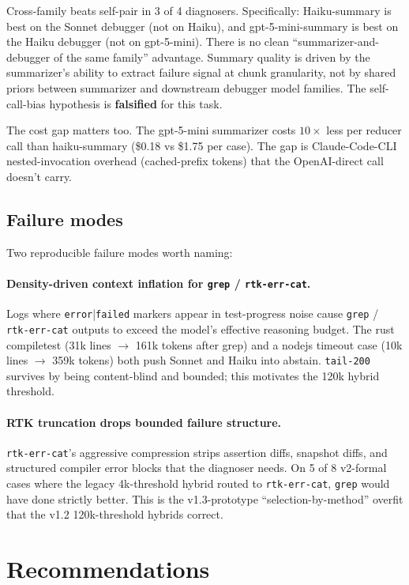 \documentclass{article}
\begin{document}
Cross-family beats self-pair in 3 of 4 diagnosers. Specifically:
Haiku-summary is best on the Sonnet debugger (not on Haiku), and
gpt-5-mini-summary is best on the Haiku debugger (not on
gpt-5-mini). There is no clean ``summarizer-and-debugger of the
same family'' advantage. Summary quality is driven by the
summarizer's ability to extract failure signal at chunk
granularity, not by shared priors between summarizer and
downstream debugger model families. The self-call-bias hypothesis
is \textbf{falsified} for this task.

The cost gap matters too. The gpt-5-mini summarizer costs $10\times$
less per reducer call than haiku-summary (\$0.18 vs \$1.75 per case).
The gap is Claude-Code-CLI nested-invocation overhead (cached-prefix
tokens) that the OpenAI-direct call doesn't carry.

\subsection{Failure modes}
\label{sec:failuremodes}

Two reproducible failure modes worth naming:

\paragraph{Density-driven context inflation for \texttt{grep} / \texttt{rtk-err-cat}.}
Logs where \texttt{error}|\texttt{failed} markers appear in
test-progress noise cause \texttt{grep} / \texttt{rtk-err-cat}
outputs to exceed the model's effective reasoning budget. The rust
compiletest (31k lines $\to$ 161k tokens after grep) and a nodejs
timeout case (10k lines $\to$ 359k tokens) both push Sonnet and
Haiku into abstain. \texttt{tail-200} survives by being
content-blind and bounded; this motivates the 120k hybrid threshold.

\paragraph{RTK truncation drops bounded failure structure.}
\texttt{rtk-err-cat}'s aggressive compression strips assertion
diffs, snapshot diffs, and structured compiler error blocks that
the diagnoser needs. On 5 of 8 v2-formal cases where the legacy
4k-threshold hybrid routed to \texttt{rtk-err-cat}, \texttt{grep}
would have done strictly better. This is the v1.3-prototype
``selection-by-method'' overfit that the v1.2 120k-threshold
hybrids correct.

\section{Recommendations}
\end{document}
